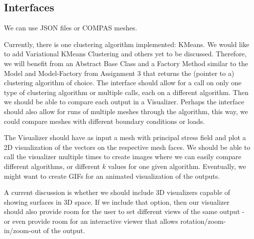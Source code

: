 \documentclass[11pt]{article}
\begin{document}
\subsection{Interfaces}
We can use JSON files or COMPAS meshes.

Currently, there is one clustering algorithm implemented: KMeans. We would like to add Variational KMeans Clustering and others yet to be discussed. Therefore, we will benefit from an Abstract Base Class and a Factory Method similar to the Model and Model-Factory from Assignment 3 that returns the (pointer to a) clustering algorithm of choice.
The interface should allow for a call on only one type of clustering algorithm or multiple calls, each on a different algorithm. Then we should be able to compare each output in a Visualizer.
Perhaps the interface should also allow for runs of multiple meshes through the algorithm, this way, we could compare meshes with different boundary conditions or loads.

The Visualizer should have as input a mesh with principal stress field and plot a 2D visualization of the vectors on the respective mesh faces. We should be able to call the visualizer multiple times to create images where we can easily compare different algorithms, or different $k$ values for one given algorithm. Eventually, we might want to create GIFs for an animated visualization of the outputs. 

A current discussion is whether we should include 3D visualizers capable of showing surfaces in 3D space. If we include that option, then our visualizer should also provide room for the user to set different views of the same output - or even provide room for an interactive viewer that allows rotation/zoom-in/zoom-out of the output.
\end{document}

